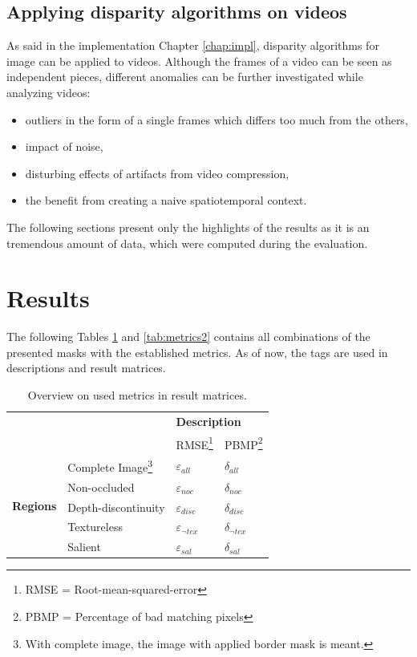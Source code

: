 \subsection*{Applying disparity algorithms on videos}

As said in the implementation Chapter \ref{chap:impl}, disparity algorithms for image can be applied to videos.
Although the frames of a video can be seen as independent pieces, different anomalies can be further investigated while analyzing videos:

\begin{itemize}
  \item outliers in the form of a single frames which differs too much from the others,
  \item impact of noise,
  \item disturbing effects of artifacts from video compression,
  \item the benefit from creating a naive spatiotemporal context.
\end{itemize}

\noindent The following sections present only the highlights of the results as it is an tremendous amount of data, which were computed during the evaluation.

\newpage
\section{Results}

\noindent The following Tables \ref{tab:metrics1} and \ref{tab:metrics2} contains all combinations of the presented masks with the established metrics.
As of now, the tags are used in descriptions and result matrices.

\begin{table}[h!]
  \centering
  \begin{tabular}{ll|l|l|}
  \cline{3-4}
   &  & \multicolumn{2}{l|}{\textbf{Description}} \\ \cline{3-4} 
   &  & RMSE\footnote{RMSE = Root-mean-squared-error} & PBMP\footnote{PBMP = Percentage of bad matching pixels} \\ \hline
  \multicolumn{1}{|l|}{\multirow{5}{*}{\textbf{Regions}}} & Complete Image\footnote{With complete image, the image with applied border mask is meant.} & $\varepsilon_{all}$ & $\delta_{all}$ \\ \cline{2-4} 
  \multicolumn{1}{|l|}{} & Non-occluded & $\varepsilon_{noc}$ & $\delta_{noc}$ \\ \cline{2-4} 
  \multicolumn{1}{|l|}{} & Depth-discontinuity & $\varepsilon_{disc}$ & $\delta_{disc}$ \\ \cline{2-4} 
  \multicolumn{1}{|l|}{} & Textureless & $\varepsilon_{\neg tex}$ & $\delta_{\neg tex}$ \\ \cline{2-4} 
  \multicolumn{1}{|l|}{} & Salient & $\varepsilon_{sal}$ & $\delta_{sal}$ \\ \hline
  \end{tabular}
  \caption{Overview on used metrics in result matrices.}
  \label{tab:metrics1}
\end{table}

